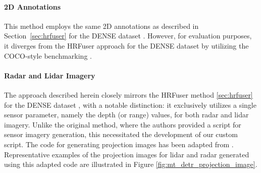 \documentclass[report.tex]{subfiles}
\begin{document}
    \paragraph*{2D Annotations}

    This method employs the same 2D annotations as described in Section~\ref{sec:hrfuser} for the DENSE dataset \cite{bijelic2020seeing}. However, for evaluation purposes, it diverges from the HRFuser approach for the DENSE dataset \cite{bijelic2020seeing} by utilizing the COCO-style benchmarking \cite{lin2014microsoft}.

    \paragraph*{Radar and Lidar Imagery}


    The approach described herein closely mirrors the HRFuser method \ref{sec:hrfuser} for the DENSE dataset \cite{bijelic2020seeing}, with a notable distinction: it exclusively utilizes a single sensor parameter, namely the depth (or range) values, for both radar and lidar imagery. Unlike the original method, where the authors provided a script for sensor imagery generation, this necessitated the development of our custom script. The code for generating projection images has been adapted from \cite{bijelic2020seeing}. Representative examples of the projection images for lidar and radar generated using this adapted code are illustrated in Figure \ref{fig:mt_detr_projection_image}.
\end{document}
